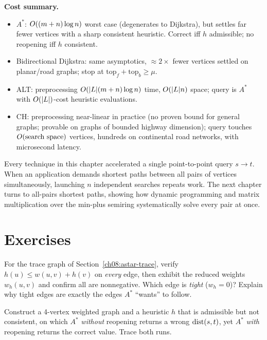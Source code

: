 \begin{complexitybox}
\textbf{Cost summary.}
\begin{itemize}
  \item $A^*$: $O((m+n)\log n)$ worst case (degenerates to Dijkstra), but
        settles far fewer vertices with a sharp consistent heuristic. Correct iff
        $h$ admissible; no reopening iff $h$ consistent.
  \item Bidirectional Dijkstra: same asymptotics, $\approx 2\times$ fewer
        vertices settled on planar/road graphs; stop at
        $\mathrm{top}_f+\mathrm{top}_b\ge\mu$.
  \item ALT: preprocessing $O(\lvert L\rvert(m+n)\log n)$ time, $O(\lvert L\rvert n)$ space;
        query is $A^*$ with $O(\lvert L\rvert)$-cost heuristic evaluations.
  \item CH: preprocessing near-linear in practice (no proven bound for general
        graphs; provable on graphs of bounded highway dimension); query touches
        $O(\text{search space})$ vertices, hundreds on continental road
        networks, with microsecond latency.
\end{itemize}
\end{complexitybox}

Every technique in this chapter accelerated a single point-to-point query $s\to t$.
When an application demands shortest paths between all pairs of vertices simultaneously,
launching $n$ independent searches repeats work.
The next chapter turns to all-pairs shortest paths, showing how dynamic programming and matrix
multiplication over the min-plus semiring systematically solve every pair at once.

\section{Exercises}
\label{ch08:exercises}

\begin{exercise}
\label{ch08:ex-consistency}
For the trace graph of Section~\ref{ch08:astar-trace}, verify
$h(u)\le w(u,v)+h(v)$ on \emph{every} edge, then exhibit the reduced weights
$w_h(u,v)$ and confirm all are nonnegative. Which edge is \emph{tight}
($w_h=0$)? Explain why tight edges are exactly the edges $A^*$ ``wants'' to
follow.
\end{exercise}

\begin{exercise}
\label{ch08:ex-adm-not-cons}
Construct a 4-vertex weighted graph and a heuristic $h$ that is admissible but
not consistent, on which $A^*$ \emph{without} reopening returns a wrong
$\operatorname{dist}(s,t)$, yet $A^*$ \emph{with} reopening returns the correct value. Trace
both runs.
\end{exercise}

